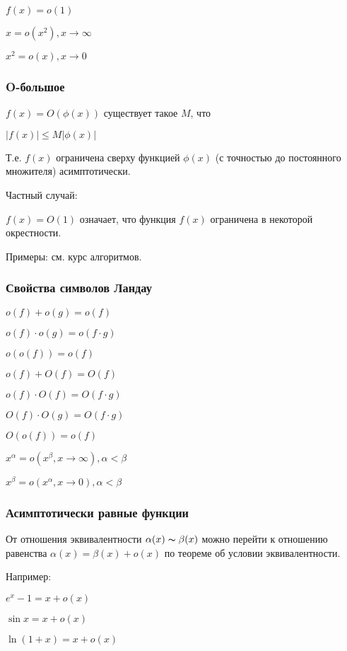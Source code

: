 $ f(x) = o( 1 ) $

$ x = o( x^2 ), x\to \infty $

$ x^2 = o( x ), x\to 0 $

\subsubsection{O-большое}

$ f(x) = O( \phi(x) ) $ существует такое $ M $, что

$ |f(x)| \le M| \phi(x) | $

Т.е. $ f(x) $ ограничена сверху функцией $ \phi(x) $
(с точностью до постоянного множителя) асимптотически.

Частный случай:

$ f(x) = O( 1 ) $ означает, что функция $ f(x) $ ограничена в некоторой окрестности.

Примеры: см. курс алгоритмов.

\subsubsection{Свойства символов Ландау}

$o(f)+o(g) = o(f)$

$o(f) \cdot o(g) = o(f \cdot g)$

$o(o(f)) = o(f)$

$o(f)+O(f) = O(f)$

$o(f) \cdot O(f) = O(f \cdot g)$

$O(f) \cdot O(g) = O(f \cdot g)$

$O(o(f)) = o(f)$ 

$x^{\alpha} = o(x^{\beta}, x\to \infty ), \alpha < \beta $ 

$x^{\beta} = o(x^{\alpha}, x\to 0 ), \alpha < \beta$ 

\subsubsection{Асимптотически равные функции}

От отношения эквивалентности $ \alpha(x) \thicksim \beta(x) $ 
можно перейти к отношению равенства $ \alpha(x) = \beta(x) + o(x) $
по теореме об условии эквивалентности.

Например:

$ e^x - 1 = x + o(x) $

$ \sin{x} = x + o(x) $

$ \ln(1+x) = x + o(x) $